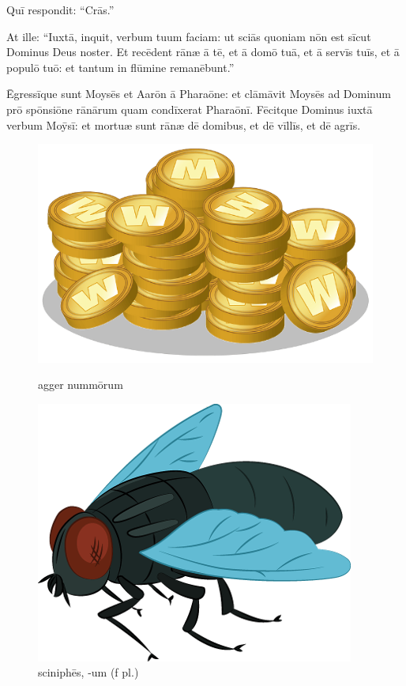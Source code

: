Quī respondit: ``Crās.''

At ille: ``Iuxtā, inquit, verbum tuum faciam: ut sciās
quoniam nōn est sīcut Dominus Deus noster.  Et recēdent
rānæ ā tē, et ā domō tuā, et ā servīs tuīs, et ā populō tuō:
et tantum in flūmine remanēbunt.''

Ēgressīque sunt
Moysēs et Aarōn ā Pharaōne: et clāmāvit
Moysēs ad Dominum prō spōnsiōne
rānārum quam condīxerat
Pharaōnī.  Fēcitque Dominus iuxtā verbum Moȳsī: et
mortuæ sunt rānæ dē domibus, et dē vīllīs, et dē agrīs.

\begin{figure}[h]
    \begin{minipage}[h!]{0.5\linewidth}
        \centering
        \includegraphics{agger.png}
        \caption{agger nummōrum}
    \end{minipage}%
    \begin{minipage}[h!]{0.5\linewidth}
        \centering
        \includegraphics{fly}
        \caption{sciniphēs, -um (f pl.)}
    \end{minipage}
\end{figure}

